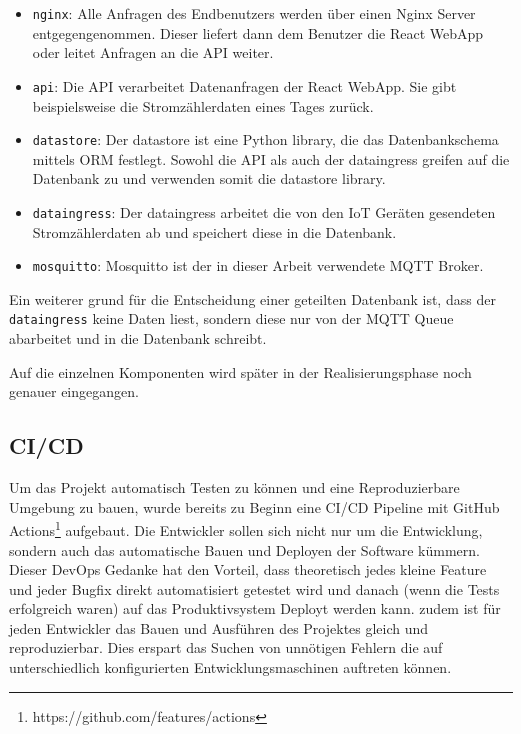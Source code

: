 \begin{itemize}
    \item \texttt{nginx}:
          Alle Anfragen des Endbenutzers werden über einen Nginx Server
          entgegengenommen. Dieser liefert dann dem Benutzer die React WebApp
          oder leitet Anfragen an die \ac{API} weiter.

    \item \texttt{api}:
          Die \ac{API} verarbeitet Datenanfragen der React WebApp. Sie gibt
          beispielsweise die Stromzählerdaten eines Tages zurück.

    \item \texttt{datastore}:
          Der datastore ist eine Python library, die das Datenbankschema mittels \ac{ORM} festlegt.
          Sowohl die \ac{API} als auch der dataingress greifen auf die Datenbank zu
          und verwenden somit die datastore library.

    \item \texttt{dataingress}:
          Der dataingress arbeitet die von den \ac{IoT} Geräten gesendeten
          Stromzählerdaten ab und speichert diese in die Datenbank.

    \item \texttt{mosquitto}:
          Mosquitto ist der in dieser Arbeit verwendete \ac{MQTT} Broker.
\end{itemize}

Ein weiterer grund für die Entscheidung einer geteilten Datenbank ist,
dass der \texttt{dataingress} keine Daten liest, sondern diese nur von
der \ac{MQTT} Queue abarbeitet und in die Datenbank schreibt.

Auf die einzelnen Komponenten wird später in der Realisierungsphase noch genauer
eingegangen.

\subsection{\ac{CI/CD}}


Um das Projekt automatisch Testen zu können und eine Reproduzierbare Umgebung zu bauen,
wurde bereits zu Beginn eine \ac{CI/CD} Pipeline mit GitHub Actions\footnote{https://github.com/features/actions}
aufgebaut.
Die Entwickler sollen sich nicht nur um die Entwicklung, sondern auch das automatische Bauen und Deployen der
Software kümmern. Dieser DevOps Gedanke hat den Vorteil, dass
theoretisch jedes kleine Feature und jeder Bugfix direkt automatisiert getestet
wird und danach (wenn die Tests erfolgreich waren) auf das Produktivsystem
Deployt werden kann. \cite{what_is_devops}
zudem ist für jeden Entwickler das Bauen und Ausführen des Projektes gleich und
reproduzierbar. Dies erspart das Suchen von unnötigen Fehlern die auf unterschiedlich
konfigurierten Entwicklungsmaschinen auftreten können.

